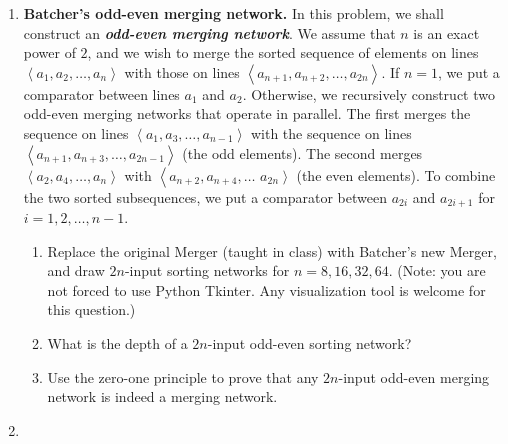 \documentclass[12pt,a4paper]{article}
\makeatletter
\newtheorem*{solution}{Solution}
\theoremstyle{definition}
\renewenvironment{solution}[1][Solution] {\par\pushQED{\qed}\normalfont\topsep6\p@\@plus6\p@\relax\trivlist\item[\hskip\labelsep\bfseries#1\@addpunct{.}]\ignorespaces}{\popQED\endtrivlist\@endpefalse} \makeatother
\makeatother
\begin{document}
\begin{enumerate}
    \item
    \textbf{Batcher's odd-even merging network.} In this problem, we shall construct an \textbf{\textit{odd-even merging network}}. We assume that $n$ is an exact power of $2$, and we wish to merge the sorted sequence of elements on lines $\left\langle a_{1}, a_{2}, \ldots, a_{n}\right\rangle$ with those on lines $\left\langle a_{n+1}, a_{n+2}, \ldots, a_{2n}\right\rangle .$ If $n=1$, we put a comparator between lines $a_{1}$ and $a_{2}$. Otherwise, we recursively construct two odd-even merging networks that operate in parallel. The first merges the sequence on lines $\left\langle a_{1}, a_{3}, \ldots, a_{n-1}\right\rangle$ with the sequence on lines $\left\langle a_{n+1}, a_{n+3}, \ldots, a_{2n-1}\right\rangle$ (the
    odd elements). The second merges $\left\langle a_{2}, a_{4}, \ldots, a_{n}\right\rangle$ with $\left\langle a_{n+2}, a_{n+4}, \ldots\right.$
    $\left.a_{2n}\right\rangle$ (the even elements). To combine the two sorted subsequences, we put a comparator between $a_{2i}$ and $a_{2i+1}$ for $i=1,2, \ldots, n-1$.
    \begin{enumerate}
    	\item Replace the original Merger (taught in class) with Batcher's new Merger, and draw $2n$-input sorting networks for $n=8, 16, 32, 64$. {\color{blue}(Note: you are not forced to use Python Tkinter. Any visualization tool is welcome for this question.)}
    	
    	\item What is the depth of a $2n$-input odd-even sorting network?
    	
    	\item
    	{\color{red}{(Optional Sub-question with Bonus)}} Use the zero-one principle to prove that any $2n$-input odd-even merging network is indeed a merging network.
    	
    \end{enumerate}
	\begin{solution}
		

\end{solution}
\end{enumerate}
\end{document}
